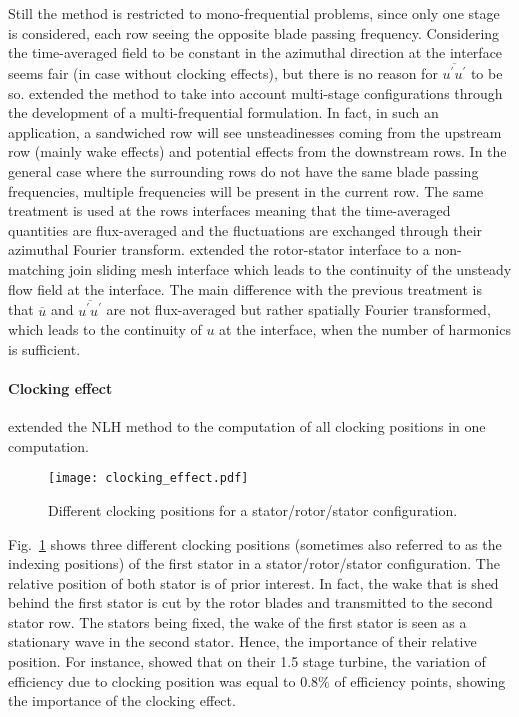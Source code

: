Still the method is restricted to mono-frequential problems, since only
one stage is considered, each row seeing the
opposite blade passing frequency. Considering
the time-averaged field to be constant in the azimuthal 
direction at the interface seems fair (in case 
without clocking effects), 
but there is
no reason for $\overline{u^\prime u^\prime}$ to be so.
\citet{He2002} extended the method to take into
account multi-stage configurations through the
development of a multi-frequential formulation.
In fact, in such an application, 
a sandwiched row will see unsteadinesses coming
from the upstream row (mainly wake effects) and
potential effects from the downstream rows. In the
general case where the surrounding rows do not have the
same blade passing frequencies, multiple frequencies
will be present in the current row.
The same treatment is used at the rows interfaces meaning
that the time-averaged quantities are flux-averaged and the
fluctuations are exchanged through their azimuthal
Fourier transform.
\citet{Vilmin2006} extended the rotor-stator
interface to a non-matching join sliding mesh interface which
leads to the continuity of the unsteady flow field at the interface.
The main difference with the previous treatment is that
$\overline{u}$ and $\overline{u^\prime u^\prime}$ 
are not flux-averaged but rather spatially Fourier transformed,
which leads to the continuity of $u$ at the interface, when
the number of harmonics is sufficient.

\paragraph{Clocking effect}
\citet{He2002} extended the NLH method to
the computation of all clocking positions in one computation.
\begin{figure}
  \centering 
  \texttt{[image: clocking\_effect.pdf]}
  \caption{Different clocking positions for a stator/rotor/stator
  configuration.}
  \label{fig:sm_nlh_clocking_effect}
\end{figure}
Fig.~\ref{fig:sm_nlh_clocking_effect} shows three
different clocking positions (sometimes also referred 
to as the indexing positions)
of the first stator
in a stator/rotor/stator configuration.
The relative position of both stator is of
prior interest. In fact, the wake that is shed behind the first stator
is cut by the rotor blades and transmitted to 
the second stator row. The stators being fixed, the wake of
the first stator is seen as a stationary wave in the second stator.
Hence, the importance of their relative position. For instance,
\citet{Huber1996} showed that
on their 1.5 stage turbine, the variation of efficiency due to clocking
position was equal to $0.8\%$ of efficiency points, showing the
importance of the clocking effect.

